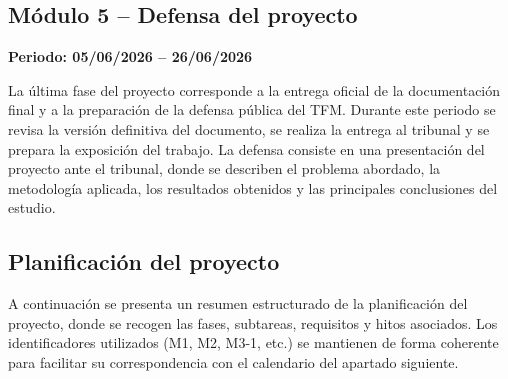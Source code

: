 \documentclass[IB,BIB]{TFUOC}%
\begin{document}
\subsection{Módulo 5 -- Defensa del proyecto}

\textbf{Periodo: 05/06/2026 -- 26/06/2026}

La última fase del proyecto corresponde a la entrega oficial de la
documentación final y a la preparación de la defensa pública del TFM.
Durante este periodo se revisa la versión definitiva del documento, se
realiza la entrega al tribunal y se prepara la exposición del trabajo.
La defensa consiste en una presentación del proyecto ante el tribunal,
donde se describen el problema abordado, la metodología aplicada, los
resultados obtenidos y las principales conclusiones del estudio.


\newpage

\subsection{Planificación del proyecto}
\label{sec:planificacion}

A continuación se presenta un resumen estructurado de la planificación del proyecto, donde se recogen las fases, subtareas, requisitos y hitos asociados. Los identificadores utilizados (M1, M2, M3-1, etc.) se mantienen de forma coherente para facilitar su correspondencia con el calendario del apartado siguiente.
\end{document}
